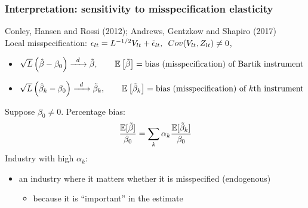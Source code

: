 \documentclass[notes,11pt, aspectratio=169]{beamer}
\begin{document}
\begin{frame}
\frametitle{Interpretation: sensitivity to misspecification elasticity}
\begin{center}
  Conley, Hansen and Rossi (2012); Andrews, Gentzkow and Shapiro (2017)\\
  Local misspecification:  $\epsilon_{lt} = L^{-1/2}V_{lt} + \tilde{\epsilon}_{lt}, \enskip Cov(V_{lt}, Z_{lt}) \not=0$,
\end{center}

\begin{itemize}
 \item $   \sqrt{L}\left(\hat{\beta} - \beta_0\right) \xrightarrow{\enskip d \enskip} \tilde{\beta}, \qquad \mathbb{E}\left[\tilde{\beta}\right] = \text{bias (misspecification) of Bartik instrument}$
 \item $   \sqrt{L}\left(\hat{\beta}_{k} - \beta_0\right) \xrightarrow{\enskip d \enskip} \tilde{\beta}_{k}, \qquad \mathbb{E}\left[\tilde{\beta}_{k}\right] = \text{bias (misspecification) of  $k$th  instrument}$

\end{itemize}

Suppose $\beta_0 \neq 0$.  Percentage bias:
\begin{equation}
  \frac{\mathbb{E}[\tilde{\beta}]}{\beta_{0}} = \sum_{k}\alpha_{k}\frac{\mathbb{E}[\tilde{\beta}_{k}]}{\beta_{0}} \notag
\end{equation} 
Industry with high $\alpha_k$: 
\begin{itemize}
\item an industry where it matters whether it is misspecified (endogenous) 
	\begin{itemize}
\item  because it is ``important'' in the estimate
	\end{itemize}
\end{itemize}


\end{frame}
\end{document}

